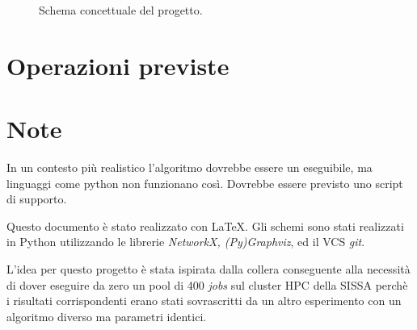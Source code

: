 \documentclass{article}
\begin{document}
\begin{figure}
    \caption{Schema concettuale del progetto.}
  \end{figure}

\section{Operazioni previste}

\section{Note}
In un contesto più realistico l'algoritmo dovrebbe essere un eseguibile, ma linguaggi come python non funzionano così. Dovrebbe essere previsto uno script di supporto.

Questo documento è stato realizzato con \LaTeX. Gli schemi sono stati realizzati in Python utilizzando le librerie \emph{NetworkX, (Py)Graphviz}, ed il VCS \emph{git}.

L'idea per questo progetto è stata ispirata dalla collera conseguente alla necessità di dover eseguire da zero un pool di 400 \emph{jobs} sul cluster HPC della SISSA perchè i risultati corrispondenti erano stati sovrascritti da un altro esperimento con un algoritmo diverso ma parametri identici.
\end{document}
